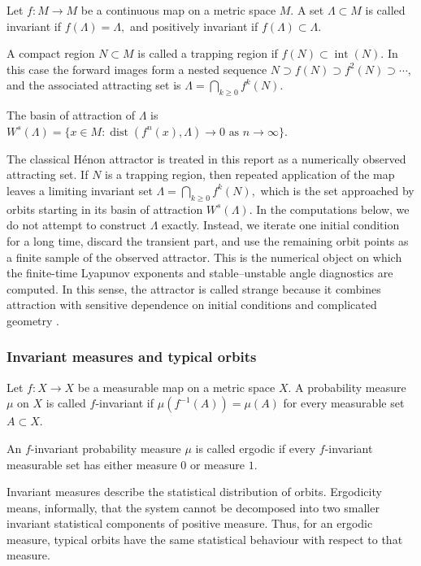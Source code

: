Let \(f:M\to M\) be a continuous map on a metric space \(M\). A set
\(\Lambda\subset M\) is called invariant if
\(f(\Lambda)=\Lambda,\) and positively invariant if
\(
f(\Lambda)\subset \Lambda.
\)

A compact region \(N\subset M\) is called a trapping region if \(f(N)\subset \operatorname{int}(N).\) In this case the forward images form a nested sequence \(N\supset f(N)\supset f^2(N)\supset \cdots,\) and the associated attracting set is \(\Lambda=\bigcap_{k\geq 0} f^k(N).\)

The basin of attraction of \(\Lambda\) is
\(W^s(\Lambda) = \{x\in M:\operatorname{dist}(f^n(x),\Lambda)\to 0
\text{ as } n\to\infty\}.\) 

The classical Hénon attractor is treated in this report as a numerically observed attracting set. If \(N\) is a trapping region, then repeated application of the map leaves a limiting invariant set \(\Lambda=\bigcap_{k\geq 0} f^k(N),\)
which is the set approached by orbits starting in its basin of attraction \(W^s(\Lambda)\). In the computations below, we do not attempt to construct \(\Lambda\) exactly. Instead, we iterate one initial condition for a long time, discard the transient part, and use the remaining orbit points as a finite sample of the observed attractor. This is the numerical object on which the finite-time Lyapunov exponents and stable--unstable angle diagnostics are computed. In this sense, the attractor is called strange because it combines attraction with sensitive dependence on initial conditions and complicated geometry \cite{Robinson1999}.





\subsubsection{Invariant measures and typical orbits}

\begin{definition}
Let \(f:X\to X\) be a measurable map on a metric space \(X\). A probability measure \(\mu\) on \(X\) is called \(f\)-invariant if \(\mu(f^{-1}(A))=\mu(A)\)
for every measurable set \(A\subset X\).

An \(f\)-invariant probability measure \(\mu\) is called ergodic if every \(f\)-invariant measurable set has either measure \(0\) or measure \(1\).
\end{definition}

Invariant measures describe the statistical distribution of orbits. Ergodicity means, informally, that the system cannot be decomposed into two smaller invariant statistical components of positive measure. Thus, for an ergodic measure, typical orbits have the same statistical behaviour with respect to that measure.

